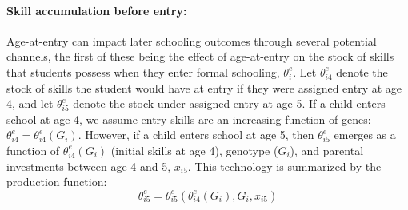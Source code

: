 \documentclass[12pt,a4paper]{article}
\begin{document}
\begin{bibunit}
\paragraph{Skill accumulation before entry:} Age-at-entry can impact later schooling outcomes through several potential channels, the first of these being the effect of age-at-entry on the stock of skills that students possess when they enter formal schooling, $\theta_{i}^{e}$. Let $\theta_{i4}^{e}$ denote the stock of skills the student would have at entry if they were assigned entry at age 4, and let  $\theta_{i5}^{e}$ denote the stock under assigned entry at age 5. If a child enters school at age 4, we assume entry skills are an increasing function of genes:  $\theta_{i4}^{e}=\theta^{e}_{i4}(G_{i})$.  However, if a child enters school at age 5, then $\theta_{i5}^{e}$ emerges as a function of $\theta^{e}_{i4}(G_{i})$ (initial skills at age 4), genotype ($G_{i}$), and parental investments between age 4 and 5, $x_{i5}$.  This technology is summarized by the production function:
\begin{equation}
    \theta_{i5}^{e}=\theta_{i5}^{e}(\theta^{e}_{i4}(G_{i}),G_{i},x_{i5})
    \label{eq:Fe}
\end{equation}


\end{bibunit}
\end{document}
